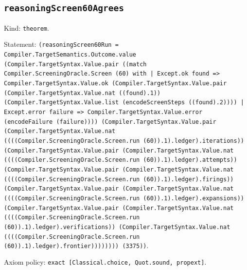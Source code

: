 \documentclass[11pt]{article}
\begin{document}
\subsection*{\texttt{reasoningScreen60Agrees}}
\noindent Kind: \texttt{theorem}.\par
\noindent Statement: \texttt{(reasoningScreen60Run = Compiler.TargetSemantics.Outcome.value (Compiler.TargetSyntax.Value.pair ((match Compiler.ScreeningOracle.Screen (60) with | Except.ok found => Compiler.TargetSyntax.Value.ok (Compiler.TargetSyntax.Value.pair (Compiler.TargetSyntax.Value.nat ((found).1)) (Compiler.TargetSyntax.Value.list (encodeScreenSteps ((found).2)))) | Except.error failure => Compiler.TargetSyntax.Value.error (encodeFailure (failure)))) (Compiler.TargetSyntax.Value.pair (Compiler.TargetSyntax.Value.nat ((((Compiler.ScreeningOracle.Screen.run (60)).1).ledger).iterations)) (Compiler.TargetSyntax.Value.pair (Compiler.TargetSyntax.Value.nat ((((Compiler.ScreeningOracle.Screen.run (60)).1).ledger).attempts)) (Compiler.TargetSyntax.Value.pair (Compiler.TargetSyntax.Value.nat ((((Compiler.ScreeningOracle.Screen.run (60)).1).ledger).firings)) (Compiler.TargetSyntax.Value.pair (Compiler.TargetSyntax.Value.nat ((((Compiler.ScreeningOracle.Screen.run (60)).1).ledger).expansions)) (Compiler.TargetSyntax.Value.pair (Compiler.TargetSyntax.Value.nat ((((Compiler.ScreeningOracle.Screen.run (60)).1).ledger).verifications)) (Compiler.TargetSyntax.Value.nat ((((Compiler.ScreeningOracle.Screen.run (60)).1).ledger).frontier)))))))) (3375))}.\par
\noindent Axiom policy: \texttt{exact [Classical.choice, Quot.sound, propext]}.\par
\end{document}
